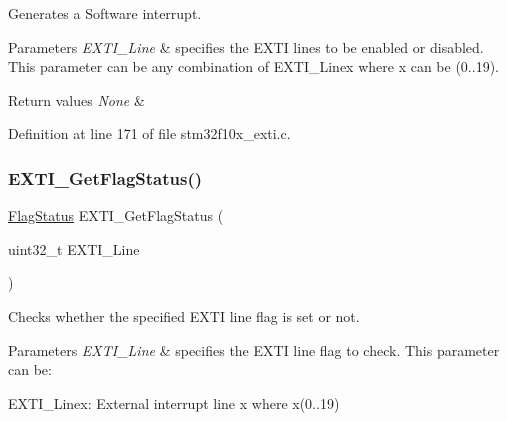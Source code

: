 Generates a Software interrupt. 


\begin{DoxyParams}{Parameters}
{\em E\+X\+T\+I\+\_\+\+Line} & specifies the E\+X\+TI lines to be enabled or disabled. This parameter can be any combination of E\+X\+T\+I\+\_\+\+Linex where x can be (0..19). \\
\hline
\end{DoxyParams}

\begin{DoxyRetVals}{Return values}
{\em None} & \\
\hline
\end{DoxyRetVals}


Definition at line 171 of file stm32f10x\+\_\+exti.\+c.

\mbox{\label{group___e_x_t_i___private___functions_ga0ce06e6b312592df149800d63218cffa}} 
\subsubsection{\texorpdfstring{E\+X\+T\+I\+\_\+\+Get\+Flag\+Status()}{EXTI\_GetFlagStatus()}}
{\footnotesize\ttfamily \hyperlink{group___exported__types_ga89136caac2e14c55151f527ac02daaff}{Flag\+Status} E\+X\+T\+I\+\_\+\+Get\+Flag\+Status (\begin{DoxyParamCaption}\item[{uint32\+\_\+t}]{E\+X\+T\+I\+\_\+\+Line }\end{DoxyParamCaption})}



Checks whether the specified E\+X\+TI line flag is set or not. 


\begin{DoxyParams}{Parameters}
{\em E\+X\+T\+I\+\_\+\+Line} & specifies the E\+X\+TI line flag to check. This parameter can be\+: \begin{DoxyItemize}
\item E\+X\+T\+I\+\_\+\+Linex\+: External interrupt line x where x(0..19) \end{DoxyItemize}
\\
\hline
\end{DoxyParams}

